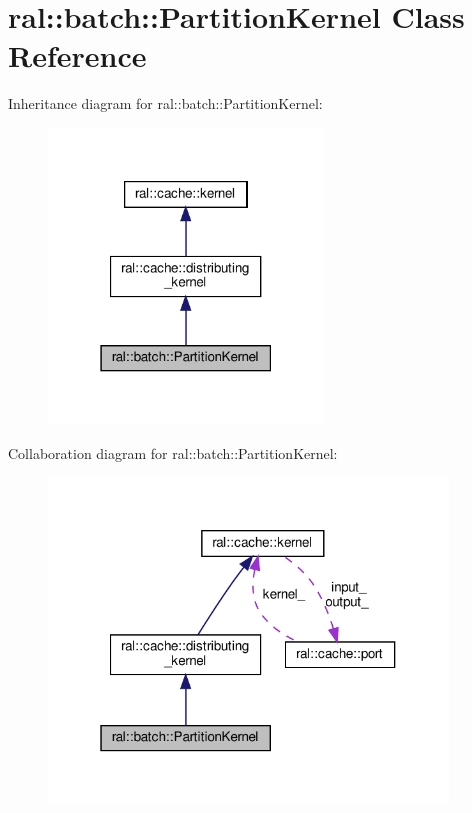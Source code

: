 \hypertarget{classral_1_1batch_1_1PartitionKernel}{}\section{ral\+:\+:batch\+:\+:Partition\+Kernel Class Reference}
\label{classral_1_1batch_1_1PartitionKernel}


Inheritance diagram for ral\+:\+:batch\+:\+:Partition\+Kernel\+:\nopagebreak
\begin{figure}[H]
\begin{center}
\leavevmode
\includegraphics[width=207pt]{classral_1_1batch_1_1PartitionKernel__inherit__graph}
\end{center}
\end{figure}


Collaboration diagram for ral\+:\+:batch\+:\+:Partition\+Kernel\+:\nopagebreak
\begin{figure}[H]
\begin{center}
\leavevmode
\includegraphics[width=301pt]{classral_1_1batch_1_1PartitionKernel__coll__graph}
\end{center}
\end{figure}
